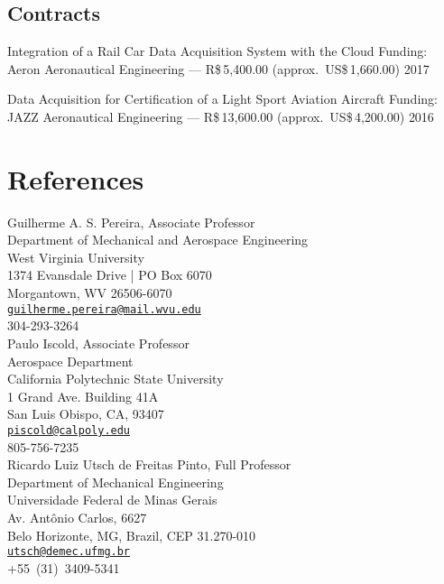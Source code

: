 \documentclass[letterpaper, 11pt, oneside]{memoir}
\begin{document}
\subsection{Contracts}
\begin{description} 
\item {Integration of a Rail Car Data Acquisition System with the Cloud}
{}{\newline Funding: Aeron Aeronautical Engineering ---
  R\$\,5,400.00 (approx.\ US\$\,1,660.00)}{}{}
 \hfill {2017}

\item 
{Data Acquisition for Certification of a Light Sport Aviation Aircraft}{}
{\newline Funding: JAZZ Aeronautical Engineering --- 
 R\$\,13,600.00 (approx.\ US\$\,4,200.00)}{}{}
\hfill {2016}
\end{description}

\section{References}
Guilherme A. S. Pereira, Associate Professor\\
Department of Mechanical and Aerospace Engineering\\
West Virginia University\\
1374 Evansdale Drive | PO Box 6070\\
Morgantown, WV 26506-6070 \\
\texttt{\href{mailto:guilherme.pereira@mail.wvu.edu}{guilherme.pereira@mail.wvu.edu}}\\
304-293-3264 
\\[1ex]

\noindent
Paulo Iscold, Associate Professor\\
Aerospace Department\\
California Polytechnic State University\\
1 Grand Ave. Building 41A\\
San Luis Obispo, CA, 93407\\
\texttt{\href{mailto:piscold@calpoly.edu}{piscold@calpoly.edu}}\\
805-756-7235
\\[1ex]

\noindent
Ricardo Luiz Utsch de Freitas Pinto, Full Professor\\
Department of Mechanical Engineering\\
Universidade Federal de Minas Gerais\\
Av. Antônio Carlos, 6627\\
Belo Horizonte, MG, Brazil, CEP 31.270-010\\
\texttt{\href{mailto:utsch@demec.ufmg.br}{utsch@demec.ufmg.br}}\\
+55~(31)~3409-5341
\\[1ex]
\end{document}
